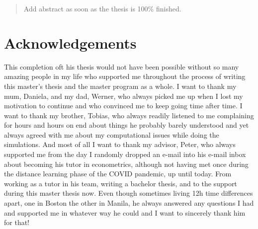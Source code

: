\documentclass[12pt,a4paper]{article}
\newenvironment{lightbluebox}{%
    \begin{tcolorbox}[colback=lightblue, colframe=lightblue, fontupper=\itshape]%
}{%
    \end{tcolorbox}%
}
\begin{document}
\begin{abstract}
\begin{lightbluebox}
Add abstract as soon as the thesis is 100\% finished.
\end{lightbluebox}
\end{abstract}

\clearpage

\section*{Acknowledgements}
\thispagestyle{empty}

This completion oft his thesis would not have been possible without so many amazing people in my life who supported me throughout the process of writing this master's thesis and the master program as a whole. I want to thank my mum, Daniela, and my dad, Werner, who always picked me up when I lost my motivation to continue and who convinced me to keep going time after time. I want to thank my brother, Tobias, who always readily listened to me complaining for hours and hours on end about things he probably barely understood and yet always agreed with me about my computational issues while doing the simulations. And most of all I want to thank my advisor, Peter, who always supported me from the day I randomly dropped an e-mail into his e-mail inbox about becoming his tutor in econometrics, although not having met once during the distance learning phase of the COVID pandemic, up until today. From working as a tutor in his team, writing a bachelor thesis, and to the support during this master thesis now. Even though sometimes living 12h time differences apart, one in Boston the other in Manila, he always answered any questions I had and supported me in whatever way he could and I want to sincerely thank him for that!  

\clearpage

\thispagestyle{plain}
\tableofcontents
\pagebreak
{}

\pagebreak
\end{document}
